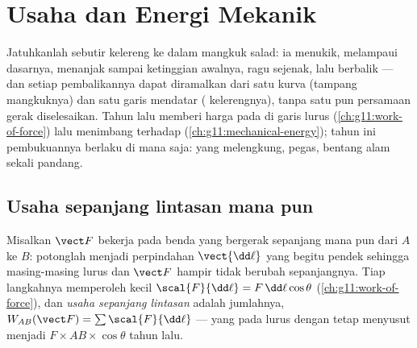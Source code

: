 \chapter{Usaha dan Energi Mekanik}\label{ch:g12:work-and-energy}

Jatuhkanlah sebutir kelereng ke dalam mangkuk salad: ia menukik, melampaui
dasarnya, menanjak sampai ketinggian awalnya, ragu sejenak, lalu berbalik ---
dan setiap pembalikannya dapat diramalkan dari satu kurva (tampang mangkuknya)
dan satu garis mendatar ( kelerengnya), tanpa satu pun persamaan gerak
diselesaikan. Tahun lalu memberi harga pada  di garis lurus
(\cref{ch:g11:work-of-force}) lalu menimbang  terhadap  (\cref{ch:g11:mechanical-energy}); tahun ini pembukuannya berlaku
di mana saja:  yang melengkung, pegas, bentang alam sekali pandang.

\section{Usaha sepanjang lintasan mana pun}

\begin{definition}\label{def:g12:work-and-energy:path}
Misalkan  $\vect F$ bekerja pada benda yang bergerak sepanjang 
mana pun dari $A$ ke $B$: potonglah  menjadi perpindahan
$\vect{\dd\ell}$ yang begitu pendek sehingga masing-masing lurus dan $\vect F$
hampir tidak berubah sepanjangnya. Tiap langkahnya memperoleh
 kecil $\scal{F}{\dd\ell} = F\,\dd\ell\cos\theta$
(\cref{ch:g11:work-of-force}), dan
\emph{usaha sepanjang lintasan} adalah
jumlahnya, $W_{AB}(\vect F) = \sum \scal{F}{\dd\ell}$ --- yang pada
 lurus dengan  tetap menyusut menjadi
$F \times AB \times \cos\theta$ tahun lalu.
\end{definition}

